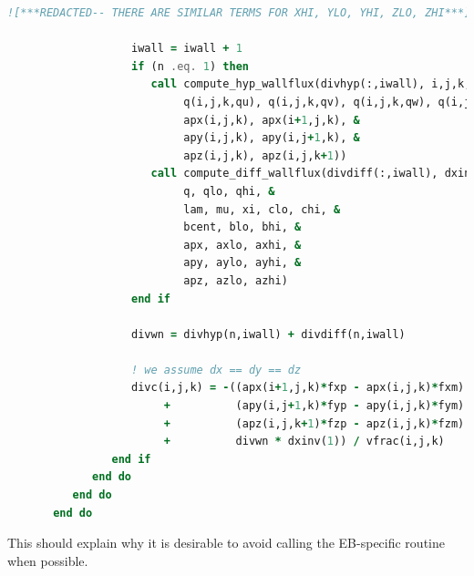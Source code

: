 \begin{lstlisting}[language=Fortran]
           ![***REDACTED-- THERE ARE SIMILAR TERMS FOR XHI, YLO, YHI, ZLO, ZHI***]

                   iwall = iwall + 1
                   if (n .eq. 1) then
                      call compute_hyp_wallflux(divhyp(:,iwall), i,j,k, q(i,j,k,qrho), &
                           q(i,j,k,qu), q(i,j,k,qv), q(i,j,k,qw), q(i,j,k,qp), &
                           apx(i,j,k), apx(i+1,j,k), &
                           apy(i,j,k), apy(i,j+1,k), &
                           apz(i,j,k), apz(i,j,k+1))
                      call compute_diff_wallflux(divdiff(:,iwall), dxinv, i,j,k, &
                           q, qlo, qhi, &
                           lam, mu, xi, clo, chi, &
                           bcent, blo, bhi, &
                           apx, axlo, axhi, &
                           apy, aylo, ayhi, &
                           apz, azlo, azhi)
                   end if

                   divwn = divhyp(n,iwall) + divdiff(n,iwall)

                   ! we assume dx == dy == dz
                   divc(i,j,k) = -((apx(i+1,j,k)*fxp - apx(i,j,k)*fxm) * dxinv(1) &
                        +          (apy(i,j+1,k)*fyp - apy(i,j,k)*fym) * dxinv(2) &
                        +          (apz(i,j,k+1)*fzp - apz(i,j,k)*fzm) * dxinv(3) &
                        +          divwn * dxinv(1)) / vfrac(i,j,k)
                end if
             end do
          end do
       end do

\end{lstlisting}
This should explain why it is desirable to avoid 
calling the EB-specific routine when possible.
